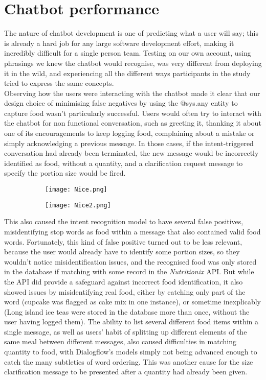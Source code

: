 \section{Chatbot performance}
The nature of chatbot development is one of predicting what a user will say; this is already a hard job for any large software development effort, making it incredibly difficult for a single person team.
Testing on our own account, using phrasings we knew the chatbot would recognise, was very different from deploying it in the wild, and experiencing all the different ways participants in the study tried to express the same concepts. \\
Observing how the users were interacting with the chatbot made it clear that our design choice of minimising false negatives by using the @sys.any entity to capture food wasn't particularly successful. Users would often try to interact with the chatbot for non functional conversation, such as greeting it, thanking it about one of its encouragements to keep logging food, complaining about a mistake or simply acknowledging a previous message. In those cases, if the intent-triggered conversation had already been terminated, the new message would be incorrectly identified as food, without a quantity, and a clarification request message to specify the portion size would be fired. \\
\begin{figure}[h!]
  \centering
  \begin{subfigure}[b]{\linewidth}
    \texttt{[image: Nice.png]}
  \end{subfigure}
  \begin{subfigure}[b]{\linewidth}
    \texttt{[image: Nice2.png]}
  \end{subfigure}
\end{figure}
This also caused the intent recognition model to have several false positives, misidentifying stop words as food within a message that also contained valid food words. Fortunately, this kind of false positive turned out to be less relevant, because the user would already have to identify some portion sizes, so they wouldn't notice misidentification issues, and the recognised food was only stored in the database if matching with some record in the \textit{Nutritionix} API. But while the API did provide a safeguard against incorrect food identification, it also showed issues by misidentifying real food, either by catching only part of the word (cupcake was flagged as cake mix in one instance), or sometime inexplicably (Long island ice teas were stored in the database more than once, without the user having logged them). The ability to list several different food items within a single message, as well as users' habit of splitting up different elements of the same meal between different messages, also caused difficulties in matching quantity to food, with Dialogflow's models simply not being advanced enough to catch the many subtleties of word ordering. This was another cause for the size clarification message to be presented after a quantity had already been given.\\
